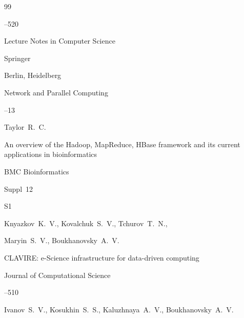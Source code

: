 \begin{thebibliography}{99}



--520 

\moreref



\serial Lecture Notes in Computer Science 

\publ Springer 

\publaddr Berlin, Heidelberg


\inbook  Network and Parallel Computing

--13








\by Taylor~R.~C.

\paper An overview of the Hadoop, MapReduce, HBase framework  and its current applications in bioinformatics 

\jour BMC Bioinformatics




\issueinfo Suppl~12

\pages S1






\by Knyazkov~K.~V., Kovalchuk~S.~V., Tchurov~T.~N.,

 Maryin~S.~V., Boukhanovsky~A.~V.

 \paper CLAVIRE:   e-Science infrastructure for data-driven computing

\jour Journal of  Computational Science





--510






\by Ivanov~S.~V., Kosukhin~S.~S., Kaluzhnaya~A.~V., Boukhanovsky~A.~V.


\end{thebibliography}
